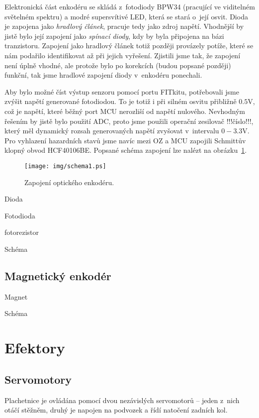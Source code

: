 Elektronická část enkodéru se skládá z~fotodiody BPW34 (pracující ve viditelném světelném spektru) a modré supersvítivé LED, která se stará o~její osvit. Dioda je zapojena jako \emph{hradlový článek}, pracuje tedy jako zdroj napětí. Vhodnější by jistě bylo její zapojení jako \emph{spínací diody}, kdy by byla připojena na bázi tranzistoru. Zapojení jako hradlový článek totiž později provázely potíže, které se nám podařilo identifikovat až při jejich vyřešení. Zjistili jsme tak, že zapojení není úplně vhodné, ale protože bylo po korekcích (budou popsané později) funkční, tak jsme hradlové zapojení diody v~enkodéru ponechali.

Aby bylo možné číst výstup senzoru pomocí portu FITkitu, potřebovali jsme zvýšit napětí generované fotodiodou. To je totiž i při silném osvitu přibližně $0.5$V, což je napětí, které běžný port MCU nerozliší od napětí nulového. Nevhodným řešením by jistě bylo použití ADC, proto jsme použili operační zesilovač !!!číslo!!!, který měl dynamický rozsah generovaných napětí zvyšovat v~intervalu $0-3.3$V. Pro vyhlazení hazardních stavů jsme navíc mezi OZ a MCU zapojili Schmittův klopný obvod HCF40106BE. Popsané schéma zapojení lze nalézt na obrázku~\ref{fig:schema1}.

\begin{figure}[h]
\centering
\texttt{[image: img/schema1.ps]}
\caption{Zapojení optického enkodéru.}
\label{fig:schema1}
\end{figure}

Dioda

Fotodioda

fotorezistor

Schéma

\subsection{Magnetický enkodér}

Magnet

Schéma
\section{Efektory}

\subsection{Servomotory}
Plachetnice je ovládána pomocí dvou nezávislých servomotorů -- jeden z~nich
otáčí stěžněm, druhý je napojen na podvozek a řídí natočení zadních kol.

